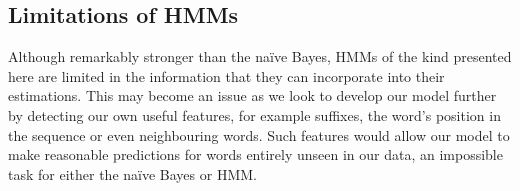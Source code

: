\documentclass[../main.tex]{subfiles}
\begin{document}
\subsection{Limitations of HMMs} \label{sec:hmm-limitations}

Although remarkably stronger than the na{\"i}ve Bayes, HMMs of the kind presented here are limited in the information that they can incorporate into their estimations.
This may become an issue as we look to develop our model further by detecting our own useful features, for example suffixes, the word's position in the sequence or even neighbouring words.
Such features would allow our model to make reasonable predictions for words entirely unseen in our data, an impossible task for either the na{\"i}ve Bayes or HMM.
\end{document}
